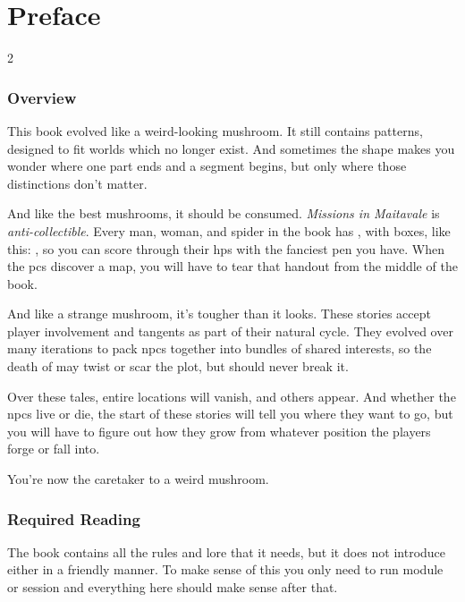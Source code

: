 \chapter{Preface}

\begin{multicols}{2}

\subsection*{Overview}

This book evolved like a weird-looking mushroom.
It still contains patterns, designed to fit worlds which no longer exist.
And sometimes the shape makes you wonder where one part ends and a segment begins, but only where those distinctions don't matter.

And like the best mushrooms, it should be consumed.
\textit{Missions in Maitavale} is \emph{anti-collectible}.
Every man, woman, and spider in the book has , with  boxes, like this: \setcounter{wounds}{2} \setcounter{freeHP}{3}\hpStat, so you can score through their \glspl{hp} with the fanciest pen you have.
When the \glspl{pc} discover a map, you will have to tear that handout from the middle of the book.
\setcounter{wounds}{0}

And like a strange mushroom, it's tougher than it looks.
These stories accept player involvement and tangents as part of their natural cycle.
They evolved over many iterations to pack \glspl{npc} together into bundles of shared interests, so the death of  may twist or scar the plot, but should never break it.

Over these tales, entire locations will vanish, and others appear.
And whether the \glspl{npc} live or die, the start of these stories will tell you where they want to go, but you will have to figure out how they grow from whatever position the players forge or fall into.

You're now the caretaker to a weird mushroom.

\subsection*{Required Reading}

The book contains all the rules and lore that it needs, but it does not introduce either in a friendly manner.
To make sense of this  you only need to run  module or session and everything here should make sense after that.


\end{multicols}
